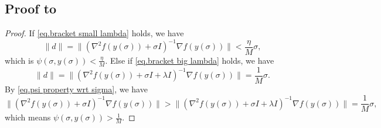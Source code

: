 \documentclass{article}
\begin{document}
\subsection*{Proof to }
\begin{proof}
    If \eqref{eq.bracket small lambda} holds, we have
    \begin{equation*}
        \|d\| = \|(\nabla^2 f(y(\sigma))+\sigma I)^{-1}\nabla f(y(\sigma))\|<\frac{\eta}{M}\sigma,
    \end{equation*}
    which is $\psi(\sigma,y(\sigma))<\frac{\eta}{M}$.
    Else if \eqref{eq.bracket big lambda} holds, we have
    \begin{equation*}
        \|d\| = \|(\nabla^2 f(y(\sigma))+\sigma I+\lambda I)^{-1}\nabla f(y(\sigma))\|=\frac{1}{M}\sigma.
    \end{equation*}
    By \eqref{eq.psi property wrt sigma}, we have
    \begin{equation*}
        \|(\nabla^2 f(y(\sigma))+\sigma I)^{-1}\nabla f(y(\sigma))\|> \|(\nabla^2 f(y(\sigma))+\sigma I+\lambda I)^{-1}\nabla f(y(\sigma))\|=\frac{1}{M}\sigma,
    \end{equation*}
    which means $\psi (\sigma,y(\sigma))>\frac{1}{M}$.
\end{proof}
\end{document}
